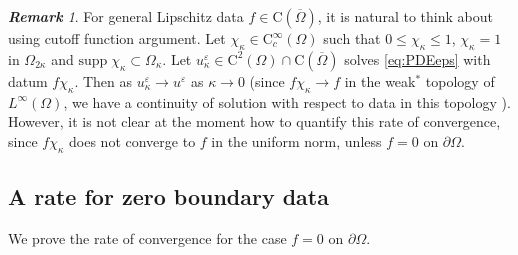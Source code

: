 \documentclass[12pt,reqno]{amsart}
\numberwithin{figure}{section}
\theoremstyle{plain}
\theoremstyle{remark}
\newtheorem{rem}{\bf{Remark}}
\numberwithin{equation}{section}
\newcommand{\rmC}{\mathrm{C}}
\begin{document}
\begin{rem} For general Lipschitz data $f\in \mathrm{C}(\overline{\Omega})$, it is natural to think about using cutoff function argument. Let $\chi_{{\kappa}}\in \mathrm{C}_c^\infty(\Omega)$ such that $0\leq \chi_{\kappa}\leq 1$, $\chi_\kappa = 1$ in $\Omega_{2\kappa}$ and $\mathrm{supp}\;\chi_\kappa\subset\Omega_\kappa$. Let $u^\varepsilon_\kappa\in \rmC^2(\Omega)\cap\rmC(\overline{\Omega})$ solves \eqref{eq:PDEeps} with datum $f\chi_{\kappa}$. Then as $u^\varepsilon_\kappa\to u^\varepsilon$ as $\kappa\to 0$ (since $f\chi_\kappa\to f$ in the weak$^*$ topology of $L^\infty(\Omega)$, we have a continuity of solution with respect to data in this topology \cite[Remark II.1]{Lasry1989}). However, it is not clear at the moment how to quantify this rate of convergence, since $f\chi_\kappa$ does not converge to $f$ in the uniform norm, unless $f = 0$ on $\partial\Omega$. 
\end{rem}
 


\subsection{A rate for zero boundary data}


We prove the rate of convergence for the case $f=0$ on $\partial \Omega$.
\end{document}
